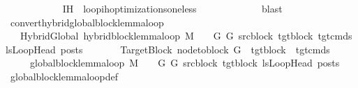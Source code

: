 \begin{isabellebody}
\ \ \ \ \ \ \ \ \ \ \isamarkupfalse%
\ IH\ \ loop{\isacharunderscore}{\kern0pt}ih{\isacharunderscore}{\kern0pt}optimizations{\isacharunderscore}{\kern0pt}one{\isacharunderscore}{\kern0pt}less\ \isanewline
\ \ \ \ \ \ \ \ \ \ \isamarkupfalse%
\ blast\isanewline
\ \ \ \ \ \ \isamarkupfalse%
\isanewline
\ \ \ \ \isamarkupfalse%
\isanewline
\ \ \isamarkupfalse%
\isanewline
{}\isamarkupfalse%
%
\endisatagproof
{\isafoldproof}%
%
\isadelimproof
%
\endisadelimproof
%
\isadelimdocument
%
\endisadelimdocument
%
\isatagdocument
%
\isamarkuptrue%
%
\endisatagdocument
{\isafolddocument}%
%
\isadelimdocument
%
\endisadelimdocument
{}\isamarkupfalse%
\ convert{\isacharunderscore}{\kern0pt}hybrid{\isacharunderscore}{\kern0pt}global{\isacharunderscore}{\kern0pt}block{\isacharunderscore}{\kern0pt}lemma{\isacharunderscore}{\kern0pt}loop{\isacharcolon}{\kern0pt}\isanewline
\ \ \ HybridGlobal{\isacharcolon}{\kern0pt}\ {\isachardoublequoteopen}hybrid{\isacharunderscore}{\kern0pt}block{\isacharunderscore}{\kern0pt}lemma{\isacharunderscore}{\kern0pt}loop\ M\ {\isasymLambda}\ {\isasymGamma}\ {\isasymOmega}\ G\ G{\isacharprime}{\kern0pt}\ src{\isacharunderscore}{\kern0pt}block\ tgt{\isacharunderscore}{\kern0pt}block\ tgt{\isacharunderscore}{\kern0pt}cmds\ lsLoopHead\ posts{\isachardoublequoteclose}\isanewline
\ \ \ \ \ \ \ TargetBlock{\isacharcolon}{\kern0pt}\ {\isachardoublequoteopen}node{\isacharunderscore}{\kern0pt}to{\isacharunderscore}{\kern0pt}block\ G{\isacharprime}{\kern0pt}\ {\isacharbang}{\kern0pt}\ tgt{\isacharunderscore}{\kern0pt}block\ {\isacharequal}{\kern0pt}\ tgt{\isacharunderscore}{\kern0pt}cmds{\isachardoublequoteclose}\isanewline
\ \ \ \ \ {\isachardoublequoteopen}global{\isacharunderscore}{\kern0pt}block{\isacharunderscore}{\kern0pt}lemma{\isacharunderscore}{\kern0pt}loop\ M\ {\isasymLambda}\ {\isasymGamma}\ {\isasymOmega}\ G\ G{\isacharprime}{\kern0pt}\ src{\isacharunderscore}{\kern0pt}block\ tgt{\isacharunderscore}{\kern0pt}block\ lsLoopHead\ posts{\isachardoublequoteclose}\isanewline
%
\isadelimproof
\ \ %
\endisadelimproof
%
\isatagproof
{}\isamarkupfalse%
\ global{\isacharunderscore}{\kern0pt}block{\isacharunderscore}{\kern0pt}lemma{\isacharunderscore}{\kern0pt}loop{\isacharunderscore}{\kern0pt}def\isanewline
{}\isamarkupfalse%

\end{isabellebody}
